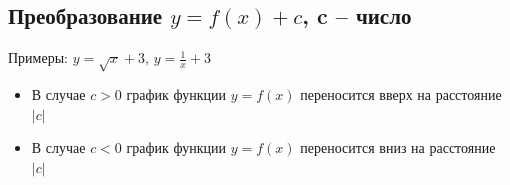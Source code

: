 \subsection{Преобразование $y = f (x) + c$, c   – число}

Примеры: $y=\sqrt{x}+3$, $y=\frac{1}{x}+3$

\begin{itemize}
    \item В случае $c > 0$ график функции $y = f (x)$ переносится вверх на расстояние $|c|$
    \item В случае $c < 0$ график функции $y = f (x)$ переносится вниз на расстояние $|c|$
\end{itemize}

\begin{figure}[h!]
	\begin{minipage}[h]{0.49\linewidth}
	\end{minipage}
	\hfill
	\begin{minipage}[h]{0.49\linewidth}
	\end{minipage}
	\label{ris:image1}
\end{figure}

